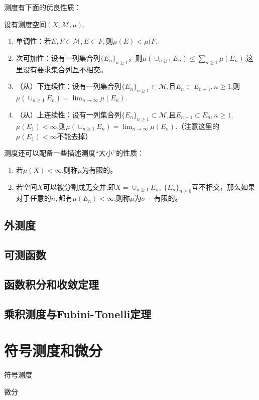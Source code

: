 \documentclass[lang=cn,10pt]{elegantbook}
\begin{document}
	测度有下面的优良性质：
	\begin{property}
		设有测度空间\((X,\mathcal{M},\mu)\),
		\begin{enumerate}
			\item 单调性：若\(E,F\in \mathcal{M},E\subset F,\)则\(\mu(E)<\mu(F\).
			\item 次可加性：设有一列集合列\(\{E_n\}_{n\ge 1}\)，则\(\mu(\cup_{n\ge 1}E_n)\le \sum_{n\ge 1}\mu(E_n)\).这里没有要求集合列互不相交。
			\item （从）下连续性：设有一列集合列\(\{E_n\}_{n\ge 1}\subset \mathcal{M}\),且\(E_n\subset E_{n+1},n\ge 1\),则\(\mu(\cup_{n\ge 1}E_n)= \lim_{n\to \infty}\mu(E_n)\).
			\item （从）上连续性：设有一列集合列\(\{E_n\}_{n\ge 1}\subset \mathcal{M}\),且\(E_{n+1}\subset E_{n},n\ge 1\),\(\mu(E_1)<\infty\),则\(\mu(\cup_{n\ge 1}E_n)= \lim_{n\to \infty}\mu(E_n)\).（注意这里的\(\mu(E_1)<\infty\)不能去掉）
		\end{enumerate}
	\end{property}
	测度还可以配备一些描述测度“大小”的性质：
	\begin{enumerate}
		\item 若\(\mu(X)<\infty\),则称\(\mu\)为有限的。
		\item 若空间\(X\)可以被分割成无交并,即\(X=\cup_{n\ge1}E_n,\ \{E_n\}_{n\ge 0}\)互不相交，那么如果对于任意的\(n,\)都有\(\mu(E_n)<\infty\),则称\(\mu\)为\(\sigma-\)有限的。
	\end{enumerate}

	\section{外测度}

	\section{可测函数}

	\section{函数积分和收敛定理}

	\section{乘积测度与Fubini-Tonelli定理}

	\chapter{符号测度和微分}
	\begin{introduction}
		\item 符号测度
		\item 微分
	\end{introduction}
	
\end{document}
